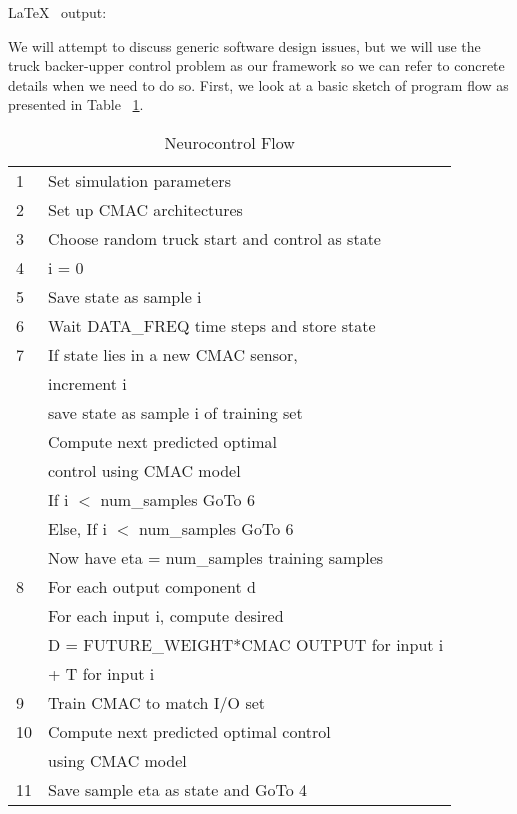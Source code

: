 \documentclass[11pt]{SelfArxOneColBMN}
\begin{document}
\noindent
\LaTeX~ output:

\noindent
We will attempt to discuss generic software design issues, but
we will use the truck backer-upper control problem as our
framework so we can refer to concrete details when we need to 
do so.  First, we look at a basic sketch of program flow as presented in
Table ~\ref{neurocontrolflow}.  
 
\begin{table}[hhh]
\caption{Neurocontrol Flow}
\begin{center}
\begin{tabular}{ll} \\
1 & Set simulation parameters  \\
2 & Set up CMAC architectures  \\
3 & Choose random truck start and control as state \\
4 & i = 0 \\
5 & Save state as sample i \\
6 & Wait DATA\_FREQ time steps and store state\\
7 &    \hspace{.2in}If state lies in a new CMAC sensor, \\
  &   \hspace{.4in}  increment i\\
  &    \hspace{.4in} save state as sample i of training set\\
  &   \hspace{.4in}  Compute next predicted optimal\\
  &   \hspace{.6in} control using CMAC model\\
  &   \hspace{.4in} If i $<$ num\_samples GoTo 6 \\
  &    \hspace{.2in}Else, If i $<$ num\_samples GoTo 6 \\
  & Now have eta = num\_samples training samples  \\
8 & For each output component d  \\
  &    \hspace{.2in}For each input i, compute desired \\
  &   \hspace{.4in} D = FUTURE\_WEIGHT*CMAC OUTPUT for input i \\
  &   \hspace{.4in} + T for input i\\
9& Train CMAC to match I/O set \\
10& Compute next predicted optimal control \\
  & \hspace{.2in} using CMAC model  \\
11& Save sample eta as state and GoTo 4
\end{tabular}
\end{center}
\label{neurocontrolflow}
\end{table}
\end{document}
